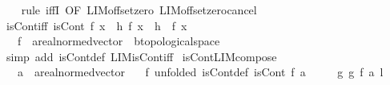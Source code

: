 \begin{isabellebody}
%
\isadelimproof
\ \ %
\endisadelimproof
%
\isatagproof
{}\isamarkupfalse%
\ {\isacharparenleft}{\kern0pt}rule\ iffI\ {\isacharbrackleft}{\kern0pt}OF\ LIM{\isacharunderscore}{\kern0pt}offset{\isacharunderscore}{\kern0pt}zero\ LIM{\isacharunderscore}{\kern0pt}offset{\isacharunderscore}{\kern0pt}zero{\isacharunderscore}{\kern0pt}cancel{\isacharbrackright}{\kern0pt}{\isacharparenright}{\kern0pt}%
\endisatagproof
{\isafoldproof}%
%
\isadelimproof
\isanewline
%
\endisadelimproof
\isanewline
{}\isamarkupfalse%
\ isCont{\isacharunderscore}{\kern0pt}iff{\isacharcolon}{\kern0pt}\ {\isachardoublequoteopen}isCont\ f\ x\ {\isacharequal}{\kern0pt}\ {\isacharparenleft}{\kern0pt}{\isasymlambda}h{\isachardot}{\kern0pt}\ f\ {\isacharparenleft}{\kern0pt}x\ {\isacharplus}{\kern0pt}\ h{\isacharparenright}{\kern0pt}{\isacharparenright}{\kern0pt}\ {\isasymmidarrow}{}{\isasymrightarrow}\ f\ x{\isachardoublequoteclose}\isanewline
\ \ \ f\ {\isacharcolon}{\kern0pt}{\isacharcolon}{\kern0pt}\ {\isachardoublequoteopen}{\isacharprime}{\kern0pt}a{\isacharcolon}{\kern0pt}{\isacharcolon}{\kern0pt}real{\isacharunderscore}{\kern0pt}normed{\isacharunderscore}{\kern0pt}vector\ {\isasymRightarrow}\ {\isacharprime}{\kern0pt}b{\isacharcolon}{\kern0pt}{\isacharcolon}{\kern0pt}topological{\isacharunderscore}{\kern0pt}space{\isachardoublequoteclose}\isanewline
%
\isadelimproof
\ \ %
\endisadelimproof
%
\isatagproof
{}\isamarkupfalse%
\ {\isacharparenleft}{\kern0pt}simp\ add{\isacharcolon}{\kern0pt}\ isCont{\isacharunderscore}{\kern0pt}def\ LIM{\isacharunderscore}{\kern0pt}isCont{\isacharunderscore}{\kern0pt}iff{\isacharparenright}{\kern0pt}%
\endisatagproof
{\isafoldproof}%
%
\isadelimproof
\isanewline
%
\endisadelimproof
\isanewline
{}\isamarkupfalse%
\ isCont{\isacharunderscore}{\kern0pt}LIM{\isacharunderscore}{\kern0pt}compose{}{\isacharcolon}{\kern0pt}\isanewline
\ \ \ a\ {\isacharcolon}{\kern0pt}{\isacharcolon}{\kern0pt}\ {\isachardoublequoteopen}{\isacharprime}{\kern0pt}a{\isacharcolon}{\kern0pt}{\isacharcolon}{\kern0pt}real{\isacharunderscore}{\kern0pt}normed{\isacharunderscore}{\kern0pt}vector{\isachardoublequoteclose}\isanewline
\ \ \ f\ {\isacharbrackleft}{\kern0pt}unfolded\ isCont{\isacharunderscore}{\kern0pt}def{\isacharbrackright}{\kern0pt}{\isacharcolon}{\kern0pt}\ {\isachardoublequoteopen}isCont\ f\ a{\isachardoublequoteclose}\isanewline
\ \ \ \ \ g{\isacharcolon}{\kern0pt}\ {\isachardoublequoteopen}g\ {\isasymmidarrow}f\ a{\isasymrightarrow}\ l{\isachardoublequoteclose}\isanewline

\end{isabellebody}
